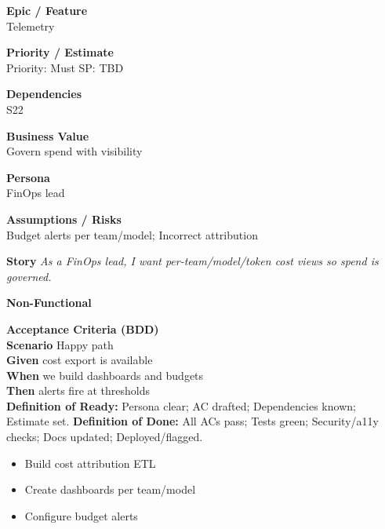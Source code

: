 \documentclass[11pt,a4paper]{article}
\newenvironment{StoryCard}[2][]{
  \begin{tcolorbox}[enhanced, breakable, sharp corners=all, colback=cardback, colframe=cardframe,
    title={#2}, fonttitle=\bfseries\large, boxrule=0.6pt, borderline west={2pt}{0pt}{accent}, #1]
}{
  \end{tcolorbox}
}
\newcommand{\badge}[1]{\pill{\footnotesize #1}}
\newcommand{\cb}{\(\square\)}
\newenvironment{TasksBox}[1][Tasks]{%
  \begin{tcolorbox}[enhanced,breakable,
    colback=cardback, colframe=cardframe, title={#1},
    borderline west={1.8pt}{0pt}{MidnightBlue},
    arc=2pt, boxrule=0.4pt,
    left=10pt,right=10pt,top=6pt,bottom=6pt,
    before skip=6pt, after skip=10pt
  ]
  \small
  \begin{itemize}[label=\cb, leftmargin=*, labelsep=0.6em, itemsep=4pt, topsep=2pt, parsep=0pt]
}{%
  \end{itemize}
  \end{tcolorbox}
}
\begin{document}
\begin{StoryCard}{S24 — Cost dashboards \& budgets}
\noindent\begin{minipage}[t]{0.49\textwidth}
\textbf{Epic / Feature}\\
Telemetry

\medskip
\textbf{Priority / Estimate}\\
Priority: Must \quad SP: TBD

\medskip
\textbf{Dependencies}\\
S22
\end{minipage}\hfill
\begin{minipage}[t]{0.49\textwidth}
\textbf{Business Value}\\
Govern spend with visibility

\medskip
\textbf{Persona}\\
FinOps lead

\medskip
\textbf{Assumptions / Risks}\\
Budget alerts per team/model; Incorrect attribution
\end{minipage}

\medskip
\textbf{Story} \emph{As a FinOps lead, I want per-team/model/token cost views so spend is governed.}

\medskip
\textbf{Non-Functional}
\badge{Cost}\ \badge{Reliability}

\medskip
\textbf{Acceptance Criteria (BDD)}\\
\textbf{Scenario} Happy path\\
\textbf{Given} cost export is available\\
\textbf{When} we build dashboards and budgets\\
\textbf{Then} alerts fire at thresholds\\

\medskip
\footnotesize \textbf{Definition of Ready:} Persona clear; AC drafted; Dependencies known; Estimate set.\quad
\textbf{Definition of Done:} All ACs pass; Tests green; Security/a11y checks; Docs updated; Deployed/flagged.
\end{StoryCard}

\begin{TasksBox}[Tasks]
  \item Build cost attribution ETL
  \item Create dashboards per team/model
  \item Configure budget alerts
\end{TasksBox}
\clearpage
\end{document}
